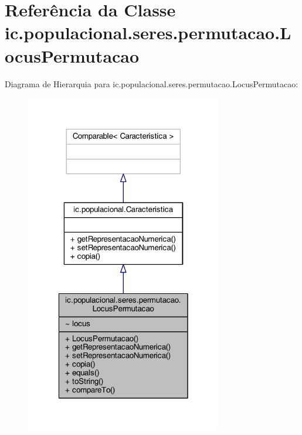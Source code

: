 \hypertarget{classic_1_1populacional_1_1seres_1_1permutacao_1_1_locus_permutacao}{\section{Referência da Classe ic.\-populacional.\-seres.\-permutacao.\-Locus\-Permutacao}
\label{classic_1_1populacional_1_1seres_1_1permutacao_1_1_locus_permutacao}
}


Diagrama de Hierarquia para ic.\-populacional.\-seres.\-permutacao.\-Locus\-Permutacao\-:
\nopagebreak
\begin{figure}[H]
\begin{center}
\leavevmode
\includegraphics[width=244pt]{classic_1_1populacional_1_1seres_1_1permutacao_1_1_locus_permutacao__inherit__graph}
\end{center}
\end{figure}


